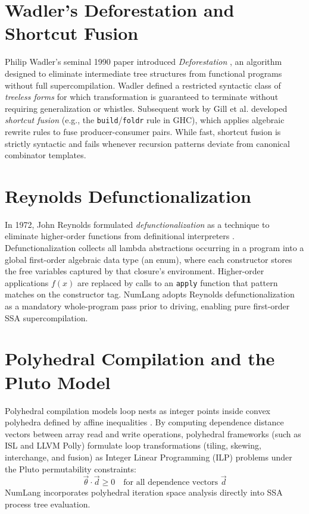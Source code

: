 \section{Wadler's Deforestation and Shortcut Fusion}
\label{sec:background:deforestation}

Philip Wadler's seminal 1990 paper introduced \emph{Deforestation} \citep{wadler1990deforestation}, an algorithm designed to eliminate intermediate tree structures from functional programs without full supercompilation. Wadler defined a restricted syntactic class of \emph{treeless forms} for which transformation is guaranteed to terminate without requiring generalization or whistles. Subsequent work by Gill et al. developed \emph{shortcut fusion} (e.g., the \texttt{build}/\texttt{foldr} rule in GHC), which applies algebraic rewrite rules to fuse producer-consumer pairs. While fast, shortcut fusion is strictly syntactic and fails whenever recursion patterns deviate from canonical combinator templates.

\section{Reynolds Defunctionalization}
\label{sec:background:reynolds}

In 1972, John Reynolds formulated \emph{defunctionalization} as a technique to eliminate higher-order functions from definitional interpreters \citep{reynolds1972definitional}. Defunctionalization collects all lambda abstractions occurring in a program into a global first-order algebraic data type (an enum), where each constructor stores the free variables captured by that closure's environment. Higher-order applications $f(x)$ are replaced by calls to an \texttt{apply} function that pattern matches on the constructor tag. NumLang adopts Reynolds defunctionalization as a mandatory whole-program pass prior to driving, enabling pure first-order SSA supercompilation.

\section{Polyhedral Compilation and the Pluto Model}
\label{sec:background:polyhedral}

Polyhedral compilation models loop nests as integer points inside convex polyhedra defined by affine inequalities \citep{bondhugula2008pluto}. By computing dependence distance vectors between array read and write operations, polyhedral frameworks (such as ISL and LLVM Polly) formulate loop transformations (tiling, skewing, interchange, and fusion) as Integer Linear Programming (ILP) problems under the Pluto permutability constraints:
\begin{equation}
\vec{\theta} \cdot \vec{d} \ge 0 \quad \text{for all dependence vectors } \vec{d}
\end{equation}
NumLang incorporates polyhedral iteration space analysis directly into SSA process tree evaluation.

